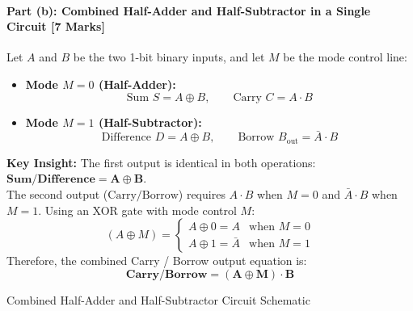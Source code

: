 \documentclass[11pt,a4paper,oneside]{book}
\begin{document}
\paragraph{Part (b): Combined Half-Adder and Half-Subtractor in a Single Circuit [7 Marks]}
Let $A$ and $B$ be the two 1-bit binary inputs, and let $M$ be the mode control line:
\begin{itemize}
  \item \textbf{Mode $M = 0$ (Half-Adder):}
  \[
  \text{Sum } S = A \oplus B, \qquad \text{Carry } C = A \cdot B
  \]
  \item \textbf{Mode $M = 1$ (Half-Subtractor):}
  \[
  \text{Difference } D = A \oplus B, \qquad \text{Borrow } B_{\text{out}} = \bar{A} \cdot B
  \]
\end{itemize}
\textbf{Key Insight:} The first output is identical in both operations: $\mathbf{\text{Sum} / \text{Difference} = A \oplus B}$.\\
The second output ($\text{Carry} / \text{Borrow}$) requires $A \cdot B$ when $M=0$ and $\bar{A} \cdot B$ when $M=1$. Using an XOR gate with mode control $M$:
\[
(A \oplus M) = \begin{cases} A \oplus 0 = A & \text{when } M = 0 \\ A \oplus 1 = \bar{A} & \text{when } M = 1 \end{cases}
\]
Therefore, the combined Carry / Borrow output equation is:
\[
\mathbf{\text{Carry} / \text{Borrow} = (A \oplus M) \cdot B}
\]

\begin{schematicbox}{Combined Half-Adder and Half-Subtractor Circuit Schematic}
\centering
{}
\end{schematicbox}
\end{document}
